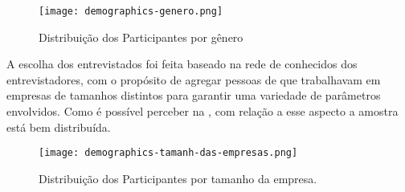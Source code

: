 \begin{figure}[ht]
\begin{center}
\texttt{[image: demographics-genero.png]}
\end{center}
\caption[Distribuição dos Participantes por gênero]{
    Distribuição dos Participantes por gênero
}\label{genero}
\end{figure}

A escolha dos entrevistados foi feita baseado na rede de conhecidos dos entrevistadores, com o propósito de agregar pessoas de que trabalhavam em empresas de tamanhos distintos para garantir uma variedade de parâmetros envolvidos. Como é possível perceber na , com relação a esse aspecto a amostra está bem distribuída. 


\begin{figure}[ht]
\begin{center}
\texttt{[image: demographics-tamanh-das-empresas.png]}
\end{center}
\caption[Distribuição dos Participantes por tamanho da empresa]{
    Distribuição dos Participantes por tamanho da empresa.
}\label{tamanho_empresa}
\end{figure}


